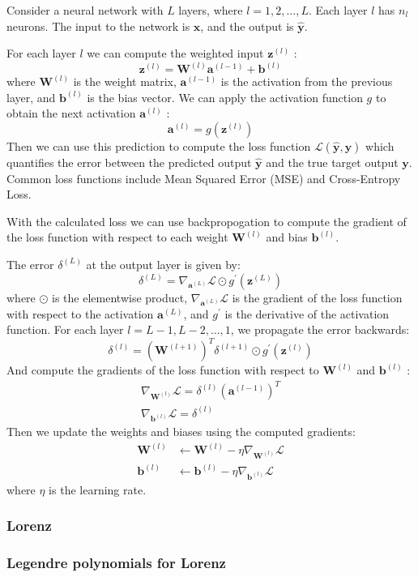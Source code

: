 Consider a neural network with $L$ layers, where $l=1,2, \ldots, L$. Each layer $l$ has $n_l$ neurons. The input to the network is $\mathbf{x}$, and the output is $\hat{\mathbf{y}}$.

For each layer $l$ we can compute the weighted input $\mathbf{z}^{(l)}$ :
$$
\mathbf{z}^{(l)}=\mathbf{W}^{(l)} \mathbf{a}^{(l-1)}+\mathbf{b}^{(l)}
$$
where $\mathbf{W}^{(l)}$ is the weight matrix, $\mathbf{a}^{(l-1)}$ is the activation from the previous layer, and $\mathbf{b}^{(l)}$ is the bias vector. We can apply the activation function $g$ to obtain the next activation $\mathbf{a}^{(l)}$ :
$$
\mathbf{a}^{(l)}=g\left(\mathbf{z}^{(l)}\right)
$$
Then we can use this prediction to compute the loss function $\mathcal{L}(\hat{\mathbf{y}}, \mathbf{y})$ which quantifies the error between the predicted output $\hat{\mathbf{y}}$ and the true target output $\mathbf{y}$. Common loss functions include Mean Squared Error (MSE) and Cross-Entropy Loss. 

With the calculated loss we can use backpropogation to compute the gradient of the loss function with respect to each weight $\mathbf{W}^{(l)}$ and bias $\mathbf{b}^{(l)}$. 

The error $\delta^{(L)}$ at the output layer is given by:
$$
\delta^{(L)}=\nabla_{\mathbf{a}^{(L)}} \mathcal{L} \odot g^{\prime}\left(\mathbf{z}^{(L)}\right)
$$
where $\odot$ is the elementwise product, $\nabla_{\mathbf{a}^{(L)}} \mathcal{L}$ is the gradient of the loss function with respect to the activation $\mathbf{a}^{(L)}$, and $g^{\prime}$ is the derivative of the activation function. For each layer $l=L-1, L-2, \ldots, 1$, we propagate the error backwards:
$$
    \delta^{(l)}=\left(\mathbf{W}^{(l+1)}\right)^T \delta^{(l+1)} \odot g^{\prime}\left(\mathbf{z}^{(l)}\right)
$$
And compute the gradients of the loss function with respect to $\mathbf{W}^{(l)}$ and $\mathbf{b}^{(l)}$ :
$$
\begin{gathered}
\nabla_{\mathbf{W}^{(l)}} \mathcal{L}=\delta^{(l)}\left(\mathbf{a}^{(l-1)}\right)^T \\
\nabla_{\mathbf{b}^{(l)}} \mathcal{L}=\delta^{(l)}
\end{gathered}
$$
Then we update the weights and biases using the computed gradients:
$$
\begin{aligned}
\mathbf{W}^{(l)} & \leftarrow \mathbf{W}^{(l)}-\eta \nabla_{\mathbf{W}^{(l)}} \mathcal{L} \\
\mathbf{b}^{(l)} & \leftarrow \mathbf{b}^{(l)}-\eta \nabla_{\mathbf{b}^{(l)}} \mathcal{L}
\end{aligned}
$$
where $\eta$ is the learning rate.

\subsubsection{Lorenz}

\subsubsection{Legendre polynomials for Lorenz}

 
